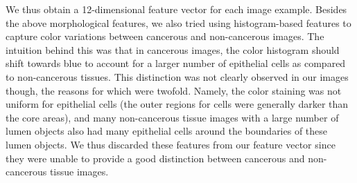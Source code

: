 We thus obtain a 12-dimensional feature vector for each image example. Besides the above morphological features, we also tried using histogram-based features to capture color variations between cancerous and non-cancerous images. The intuition behind this was that in cancerous images, the color histogram should shift towards blue to account for a larger number of epithelial cells as compared to non-cancerous tissues. This distinction was not clearly observed in our images though, the reasons for which were twofold. Namely, the color staining was not uniform for epithelial cells (the outer regions for cells were generally darker than the core areas), and many non-cancerous tissue images with a large number of lumen objects also had many epithelial cells around the boundaries of these lumen objects. We thus discarded these features from our feature vector since they were unable to provide a good distinction between cancerous and non-cancerous tissue images.

\label{sec:image_based_approaches}